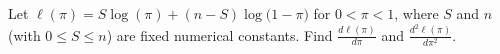 \documentclass[border=3bp]{standalone}
\begin{document}
\begin{minipage}{3.5in}
Let $\ell(\pi)=S\log(\pi)+(n-S)\log\!\bigl(1-\pi\bigr)$ for $0<\pi<1$, where $S$ and $n$ (with $0\le S\le n$) are fixed numerical constants. Find $\frac{d\ell(\pi)}{d\pi}$ and $\frac{d^{2}\ell(\pi)}{d\pi^{2}}$.
\end{minipage}
\end{document}
